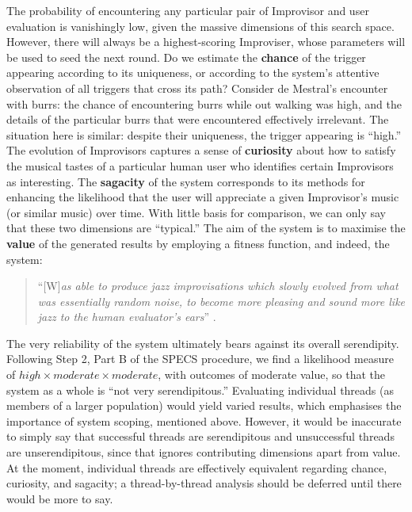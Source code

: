 The probability of encountering any particular pair of Improvisor and
user evaluation is vanishingly low, given the massive dimensions of
this search space.  However, there will always be a highest-scoring
Improviser, whose parameters will be used to seed the next round.  Do
we estimate the \textbf{chance} of the trigger appearing according to
its uniqueness, or according to the system's attentive observation of
all triggers that cross its path?  Consider de Mestral's encounter
with burrs: the chance of encountering burrs while out walking was
high, and the details of the particular burrs that were encountered
effectively irrelevant.  The situation here is similar: despite their
uniqueness, the trigger appearing is ``high.''  The evolution of
Improvisors captures a sense of \textbf{curiosity} about how to
satisfy the musical tastes of a particular human user who identifies
certain Improvisors as interesting.  The \textbf{sagacity} of the
system corresponds to its methods for enhancing the likelihood that
the user will appreciate a given Improvisor's music (or similar music)
over time.  With little basis for comparison, we can only say that
these two dimensions are ``typical.''  The aim of the system is to
maximise the \textbf{value} of the generated results by employing a
fitness function, and indeed, the system:
\begin{quote}
``{[}W{]}\emph{as able to produce jazz
improvisations which slowly evolved from what was essentially random
noise, to become more pleasing and sound more like jazz to the human
evaluator's ears}'' \cite{jordanous10}.
\end{quote}
The very reliability of the
system ultimately bears against its overall serendipity.  Following
Step 2, Part B of the SPECS procedure, we find a likelihood measure of
$\mathit{high}\times\mathit{moderate}\times\mathit{moderate}$, with
outcomes of moderate value, so that the system as a whole is ``not
very serendipitous.''  Evaluating individual threads (as members
of a larger population) would yield varied results, which
emphasises the importance of system scoping, mentioned above.
However, it would be inaccurate to simply say that successful threads are serendipitous and unsuccessful threads are unserendipitous,  since that ignores contributing dimensions apart from value.  At the moment, individual threads are effectively equivalent regarding chance,
curiosity, and sagacity; a thread-by-thread analysis should be deferred until there would be more to say.

